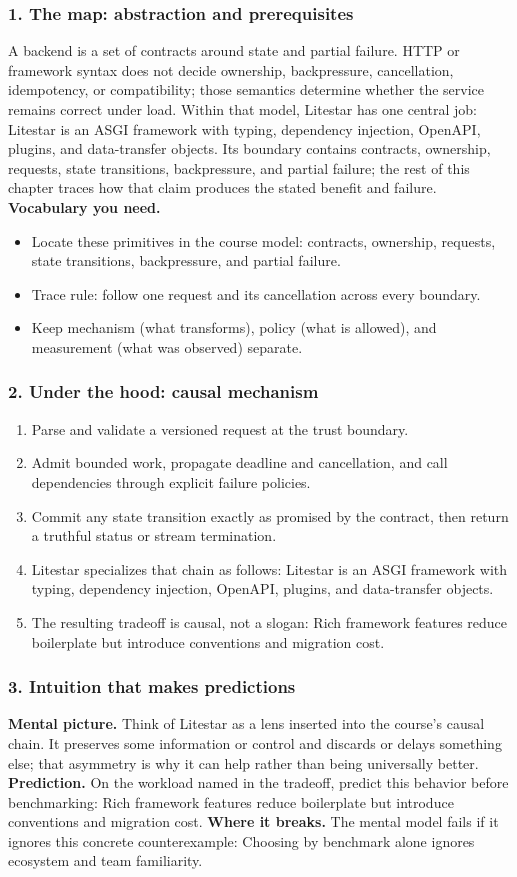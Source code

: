 \subsubsection*{1. The map: abstraction and prerequisites}
A backend is a set of contracts around state and partial failure. HTTP or framework syntax does not decide ownership, backpressure, cancellation, idempotency, or compatibility; those semantics determine whether the service remains correct under load.
Within that model, Litestar has one central job: Litestar is an ASGI framework with typing, dependency injection, OpenAPI, plugins, and data-transfer objects. Its boundary contains contracts, ownership, requests, state transitions, backpressure, and partial failure; the rest of this chapter traces how that claim produces the stated benefit and failure.
\textbf{Vocabulary you need.}\begin{itemize}
\item Locate these primitives in the course model: contracts, ownership, requests, state transitions, backpressure, and partial failure.
\item Trace rule: follow one request and its cancellation across every boundary.
\item Keep mechanism (what transforms), policy (what is allowed), and measurement (what was observed) separate.
\end{itemize}
\subsubsection*{2. Under the hood: causal mechanism}\begin{enumerate}
\item Parse and validate a versioned request at the trust boundary.
\item Admit bounded work, propagate deadline and cancellation, and call dependencies through explicit failure policies.
\item Commit any state transition exactly as promised by the contract, then return a truthful status or stream termination.
\item Litestar specializes that chain as follows: Litestar is an ASGI framework with typing, dependency injection, OpenAPI, plugins, and data-transfer objects.
\item The resulting tradeoff is causal, not a slogan: Rich framework features reduce boilerplate but introduce conventions and migration cost.
\end{enumerate}
\subsubsection*{3. Intuition that makes predictions}
\textbf{Mental picture.} Think of Litestar as a lens inserted into the course's causal chain. It preserves some information or control and discards or delays something else; that asymmetry is why it can help rather than being universally better.
\textbf{Prediction.} On the workload named in the tradeoff, predict this behavior before benchmarking: Rich framework features reduce boilerplate but introduce conventions and migration cost.
\textbf{Where it breaks.} The mental model fails if it ignores this concrete counterexample: Choosing by benchmark alone ignores ecosystem and team familiarity.
